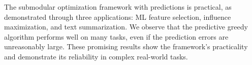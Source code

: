 The submodular optimization framework with predictions is practical, as demonstrated through three applications: ML feature selection, influence maximization, and text summarization. We observe that the predictive greedy algorithm performs well on many tasks, even if the prediction errors are unreasonably large. These promising results show the framework's practicality and demonstrate its reliability in complex real-world tasks.
